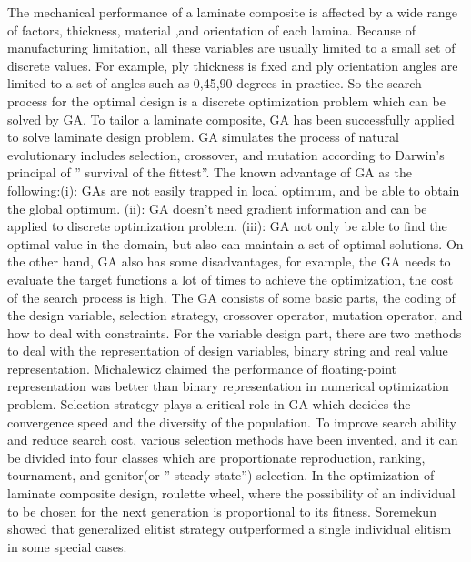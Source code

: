 \documentclass[USenglish]{article}
\begin{document}
  The mechanical performance of a laminate composite is affected by a wide range of factors,
thickness, material ,and orientation of each lamina. Because of manufacturing limitation, all these
variables are usually limited to a small set of discrete values. For example, ply thickness is fixed
and ply orientation angles are limited to a set of angles such as 0,45,90 degrees in practice. So
the search process for the optimal design is a discrete optimization problem which can be solved by
GA. To tailor a laminate composite, GA has been successfully applied to solve laminate design
problem\cite{riche1993optimization,nagendra1996improved,sadagopan1998application,todoroki1998stacking,liu2000permutation,sivakumar1998optimum,walker2003technique,lin2004stacking,kang2005minimum,murugan2007target,akbulut2008optimum}.
GA simulates the process of natural evolutionary includes selection, crossover, and mutation
according to Darwin's principal of '' survival of the fittest''. The known advantage of GA as the
following:(i): GAs are not easily trapped in local optimum, and be able to obtain the global
optimum. (ii): GA doesn't need gradient information and can be applied to discrete optimization
problem. (iii): GA not only be able to find the optimal value in the domain, but also can maintain a
set of optimal solutions. On the other hand, GA also has some disadvantages, for example, the GA
needs to evaluate the target functions a lot of times to achieve the optimization, the cost of the
search process is high. The GA consists of some basic parts, the coding of the design variable,
selection strategy, crossover operator, mutation operator, and how to deal with constraints. For the
variable design part, there are two methods to deal with the representation of design variables,
binary string and real value representation\cite{riche1993optimization,todoroki1998stacking}.
Michalewicz\cite{zbigniew1996genetic} claimed the performance of floating-point representation was
better than binary representation in numerical optimization problem. Selection strategy plays a
critical role in GA which decides the convergence speed and the diversity of the population. To
improve search ability and reduce search cost, various selection methods have been invented, and it
can be divided into four classes which are proportionate reproduction, ranking, tournament, and
genitor(or '' steady state'') selection. In the optimization of laminate composite design, roulette
wheel\cite{riche1993optimization,seresta2007optimal}, where the possibility of an individual to be
chosen for the next generation is proportional to its fitness.
Soremekun\cite{soremekun2001composite} showed that generalized elitist strategy outperformed a
single individual elitism in some special cases.
\end{document}
